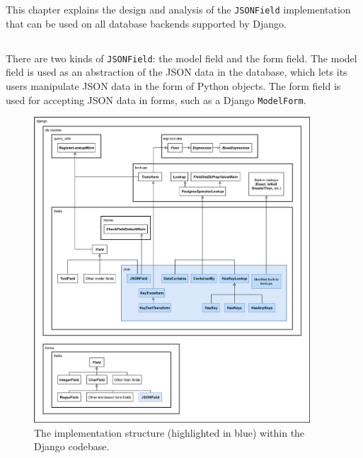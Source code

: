 \chapter{\babTiga}

This chapter explains the design and analysis of the \verb|JSONField|
implementation that can be used on all database backends supported by Django.

\section{}

There are two kinds of \verb|JSONField|: the model field and the form field.
The model field is used as an abstraction of the JSON data in the database,
which lets its users manipulate JSON data in the form of Python objects.
The form field is used for accepting JSON data in forms, such as a Django
\verb|ModelForm|.

\begin{figure}
	\centering
    \includegraphics[width=0.92\textwidth]{pics/structure-design.png}
	\caption{The  implementation structure (highlighted in
	blue) within the Django codebase.}
	\label{fig:structure}
\end{figure}


